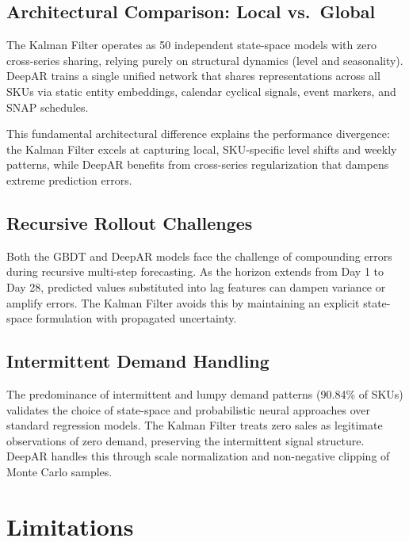 \documentclass[conference]{IEEEtran}
\begin{document}
\subsection{Architectural Comparison: Local vs.\ Global}

The Kalman Filter operates as 50 independent state-space models with zero cross-series sharing, relying purely on structural dynamics (level and seasonality). DeepAR trains a single unified network that shares representations across all SKUs via static entity embeddings, calendar cyclical signals, event markers, and SNAP schedules.

This fundamental architectural difference explains the performance divergence: the Kalman Filter excels at capturing local, SKU-specific level shifts and weekly patterns, while DeepAR benefits from cross-series regularization that dampens extreme prediction errors.

\subsection{Recursive Rollout Challenges}

Both the GBDT and DeepAR models face the challenge of compounding errors during recursive multi-step forecasting. As the horizon extends from Day 1 to Day 28, predicted values substituted into lag features can dampen variance or amplify errors. The Kalman Filter avoids this by maintaining an explicit state-space formulation with propagated uncertainty.

\subsection{Intermittent Demand Handling}

The predominance of intermittent and lumpy demand patterns (90.84\% of SKUs) validates the choice of state-space and probabilistic neural approaches over standard regression models. The Kalman Filter treats zero sales as legitimate observations of zero demand, preserving the intermittent signal structure. DeepAR handles this through scale normalization and non-negative clipping of Monte Carlo samples.

\section{Limitations}
\end{document}
